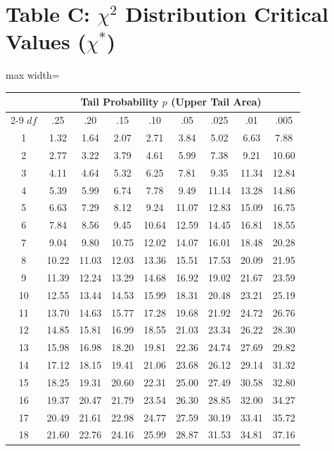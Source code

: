 \section{Table C: $\chi^2$ Distribution Critical Values ($\chi^*$)}
\begin{center}
\small
\begin{adjustbox}{max width=\linewidth}
\begin{tabular}{ccccccccc}
\toprule
& \multicolumn{8}{c}{\textbf{Tail Probability $p$ (Upper Tail Area)}} \\
\cmidrule(lr){2-9}
$df$ & .25 & .20 & .15 & .10 & .05 & .025 & .01 & .005 \\
\midrule
1 & 1.32 & 1.64 & 2.07 & 2.71 & 3.84 & 5.02 & 6.63 & 7.88 \\
2 & 2.77 & 3.22 & 3.79 & 4.61 & 5.99 & 7.38 & 9.21 & 10.60 \\
3 & 4.11 & 4.64 & 5.32 & 6.25 & 7.81 & 9.35 & 11.34 & 12.84 \\
4 & 5.39 & 5.99 & 6.74 & 7.78 & 9.49 & 11.14 & 13.28 & 14.86 \\
5 & 6.63 & 7.29 & 8.12 & 9.24 & 11.07 & 12.83 & 15.09 & 16.75 \\
\midrule
6 & 7.84 & 8.56 & 9.45 & 10.64 & 12.59 & 14.45 & 16.81 & 18.55 \\
7 & 9.04 & 9.80 & 10.75 & 12.02 & 14.07 & 16.01 & 18.48 & 20.28 \\
8 & 10.22 & 11.03 & 12.03 & 13.36 & 15.51 & 17.53 & 20.09 & 21.95 \\
9 & 11.39 & 12.24 & 13.29 & 14.68 & 16.92 & 19.02 & 21.67 & 23.59 \\
10 & 12.55 & 13.44 & 14.53 & 15.99 & 18.31 & 20.48 & 23.21 & 25.19 \\
\midrule
11 & 13.70 & 14.63 & 15.77 & 17.28 & 19.68 & 21.92 & 24.72 & 26.76 \\
12 & 14.85 & 15.81 & 16.99 & 18.55 & 21.03 & 23.34 & 26.22 & 28.30 \\
13 & 15.98 & 16.98 & 18.20 & 19.81 & 22.36 & 24.74 & 27.69 & 29.82 \\
14 & 17.12 & 18.15 & 19.41 & 21.06 & 23.68 & 26.12 & 29.14 & 31.32 \\
15 & 18.25 & 19.31 & 20.60 & 22.31 & 25.00 & 27.49 & 30.58 & 32.80 \\
\midrule
16 & 19.37 & 20.47 & 21.79 & 23.54 & 26.30 & 28.85 & 32.00 & 34.27 \\
17 & 20.49 & 21.61 & 22.98 & 24.77 & 27.59 & 30.19 & 33.41 & 35.72 \\
18 & 21.60 & 22.76 & 24.16 & 25.99 & 28.87 & 31.53 & 34.81 & 37.16 \\

\end{tabular}
\end{adjustbox}
\end{center}
